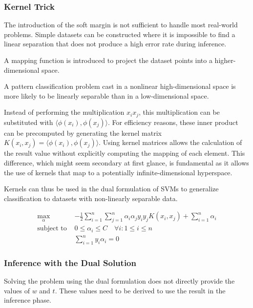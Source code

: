 \subsubsection{Kernel Trick}

The introduction of the soft margin is not sufficient to handle most real-world problems. Simple datasets can be constructed where it is impossible to find a linear separation that does not produce a high error rate during inference.

A mapping function is introduced to project the dataset points into a higher-dimensional space.

\begin{theorem}[Cover]
  A pattern classification problem cast in a nonlinear high-dimensional space is more likely to be linearly separable than in a low-dimensional space\cite{ThCover}.
\end{theorem}

Instead of performing the multiplication $x_ix_j$, this multiplication can be substituted with $\langle\phi(x_i), \phi(x_j)\rangle$. For efficiency reasons, these inner product can be precomputed by generating the kernel matrix $K(x_i, x_j) = \langle\phi(x_i),\phi(x_j)\rangle$. Using kernel matrices allows the calculation of the result value without explicitly computing the mapping of each element. This difference, which might seem secondary at first glance, is fundamental as it allows the use of kernels that map to a potentially infinite-dimensional hyperspace.

Kernels can thus be used in the dual formulation of SVMs to generalize classification to datasets with non-linearly separable data.

\begin{align}
    \label{eq:svm-obj}
    \max_\alpha\ & -\frac{1}{2}\sum_{i=1}^n\sum_{j=1}^n\alpha_i\alpha_jy_iy_jK(x_i, x_j) + \sum_{i=1}^n\alpha_i \\ 
    \label{eq:svm-c1}
    \text{subject to } & 0 \leq \alpha_i \leq C \quad \forall i: 1\leq i\leq n \\
    \label{eq:svm-c2}
    & \sum_{i=1}^ny_i\alpha_i=0
\end{align}

\subsubsection{Inference with the Dual Solution}

Solving the problem using the dual formulation does not directly provide the values of $w$ and $t$. These values need to be derived to use the result in the inference phase.


